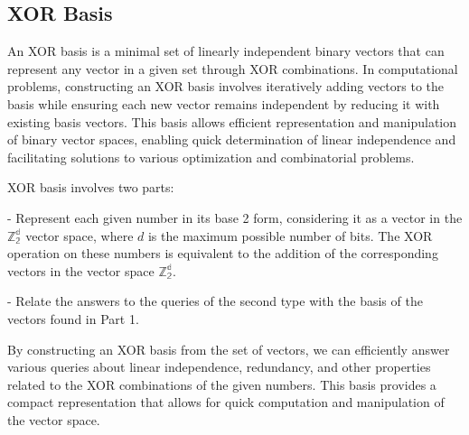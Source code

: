 \subsection{XOR Basis}

An XOR basis is a minimal set of linearly independent binary vectors that can represent any vector in a given set through XOR combinations. In computational problems, constructing an XOR basis involves iteratively adding vectors to the basis while ensuring each new vector remains independent by reducing it with existing basis vectors. This basis allows efficient representation and manipulation of binary vector spaces, enabling quick determination of linear independence and facilitating solutions to various optimization and combinatorial problems.

XOR basis involves two parts:

- Represent each given number in its base 2 form, considering it as a vector in the ${\mathbb{Z_2^d}}$ vector space, where $d$ is the maximum possible number of bits. The XOR operation on these numbers is equivalent to the addition of the corresponding vectors in the vector space ${\mathbb{Z_2^d}}$.

- Relate the answers to the queries of the second type with the basis of the vectors found in Part 1.

By constructing an XOR basis from the set of vectors, we can efficiently answer various queries about linear independence, redundancy, and other properties related to the XOR combinations of the given numbers. This basis provides a compact representation that allows for quick computation and manipulation of the vector space.
